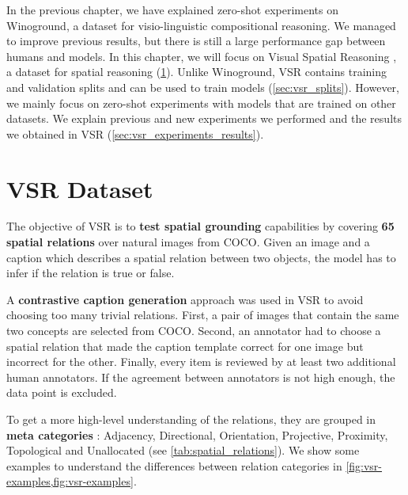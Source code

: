 In the previous chapter, we have explained zero-shot experiments on Winoground, a dataset for visio-linguistic compositional reasoning. We managed to improve previous results, but there is still a large performance gap between humans and models. In this chapter, we will focus on Visual Spatial Reasoning \cite{liu2022visual}, a dataset for spatial reasoning (\cref{sec:vsr_dataset}). Unlike Winoground, VSR contains training and validation splits and can be used to train models (\cref{sec:vsr_splits}). However, we mainly focus on zero-shot experiments with models that are trained on other datasets. We explain previous and new experiments we performed and the results we obtained in VSR (\cref{sec:vsr_experiments_results}).

\section{VSR Dataset} \label{sec:vsr_dataset}

The objective of VSR is to \textbf{test spatial grounding} capabilities by covering \textbf{65 spatial relations} over natural images from COCO. Given an image and a caption which describes a spatial relation between two objects, the model has to infer if the relation is true or false.

A \textbf{contrastive caption generation} approach was used in VSR to avoid choosing too many trivial relations. First, a pair of images that contain the same two concepts are selected from COCO. Second, an annotator had to choose a spatial relation that made the caption template correct for one image but incorrect for the other. Finally, every item is reviewed by at least two additional human annotators. If the agreement between annotators is not high enough, the data point is excluded.

To get a more high-level understanding of the relations, they are grouped in \textbf{meta categories} \cite{marchi2021cross}: Adjacency, Directional, Orientation, Projective, Proximity, Topological and Unallocated (see \cref{tab:spatial_relations}). We show some examples to understand the differences between relation categories in \cref{fig:vsr-examples,fig:vsr-examples}.

